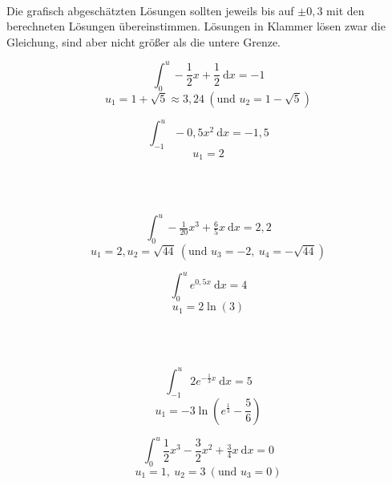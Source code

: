 \documentclass[a4paper,12pt, headsepline, ngerman]{scrartcl}
\theoremstyle{definition}
\newcommand{\td}{\ \text{d}}
\newcommand{\fakesubsection}[1]{%
	\par\refstepcounter{subsection}%
	\subsectionmark{#1}%
	\addcontentsline{toc}{subsection}{\protect\numberline{\thesubsection}#1}%
}
\begin{document}
\begin{Answer}[ref=intGrenzeA1]\\
	Die grafisch abgeschätzten Lösungen sollten jeweils bis auf \(\pm0,3\) mit den berechneten Lösungen übereinstimmen. Lösungen in Klammer lösen zwar die Gleichung, sind aber nicht größer als die untere Grenze.\\
	\begin{minipage}{\textwidth}
		\begin{minipage}{.5\textwidth}\raggedright
			\[\int_0^u-\frac{1}{2}x+\frac{1}{2} \td x=-1\]
			\[u_1=1+\sqrt{5}\approx3,24\ \left(\text{und }u_2=1-\sqrt{5}\right)\] 
		\end{minipage}
		\begin{minipage}{.5\textwidth}
			\[\int_{-1}^u-0,5x^2 \td x=-1,5\]
			\[u_1=2\]
		\end{minipage}\vspace{\baselineskip}\\\vspace{\baselineskip}\\
		\begin{minipage}{.5\textwidth}\raggedright
			\[\int_0^u-\tfrac{1}{20}x^3+\tfrac{6}{5}x \td x=2,2\]
			\[u_1=2, u_2=\sqrt{44}\ \left(\text{und }u_3=-2,\ u_4=-\sqrt{44}\right)\]
		\end{minipage}
		\begin{minipage}{.5\textwidth}
			\[\int_0^u e^{0,5x} \td x=4\]
			\[u_1=2\ln(3)\]
		\end{minipage}\vspace{\baselineskip}\\\vspace{\baselineskip}\\
		\begin{minipage}{.5\textwidth}\raggedright
			\[\int_{-1}^u 2e^{-\tfrac{1}{3}x} \td x=5\]
			\[u_1=-3\ln\left(e^{\tfrac{1}{3}}-\frac{5}{6}\right)\]
		\end{minipage}
		\begin{minipage}{.5\textwidth}
			\[\int_0^u \frac{1}{2}x^3-\frac{3}{2}x^2+\tfrac{3}{4}x \td x=0\]
			\[u_1=1,\ u_2=3\ \left(\text{und }u_3=0\right)\] 
		\end{minipage}
	\end{minipage}
\end{Answer}

\end{document}
